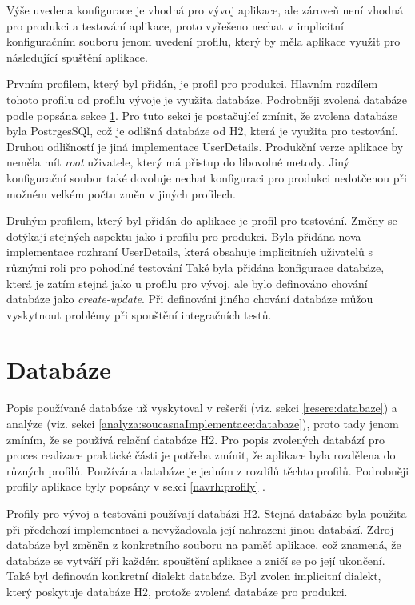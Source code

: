     Výše uvedena konfigurace je vhodná pro vývoj aplikace, ale zároveň není vhodná pro produkci a testování aplikace, proto vyřešeno nechat v implicitní konfiguračním souboru jenom uvedení profilu, který by měla aplikace využit pro následující spuštění aplikace.
    
    Prvním profilem, který byl přidán, je profil pro produkci. Hlavním rozdílem tohoto profilu od profilu vývoje je využita databáze. Podrobněji zvolená databáze podle popsána sekce \ref{navrh:db}. Pro tuto sekci je postačující zmínit, že zvolena databáze byla PostrgesSQl, což je odlišná databáze od H2, která je využita pro testování. Druhou odlišností je jiná implementace UserDetails. Produkční verze aplikace by neměla mít \textit{root} uživatele, který má přistup do libovolné metody. Jiný konfigurační soubor také dovoluje nechat konfiguraci pro produkci nedotčenou při možném velkém počtu změn v jiných profilech.
    
    Druhým profilem, který byl přidán do aplikace je profil pro testování. Změny se dotýkají stejných aspektu jako i profilu pro produkci. Byla přidána nova implementace rozhraní UserDetails, která obsahuje implicitních uživatelů s různými roli pro pohodlné testování  Také byla přidána konfigurace databáze, která je zatím stejná jako u profilu pro vývoj, ale bylo definováno chování databáze jako \textit{create-update}. Při definováni jiného chování databáze můžou vyskytnout problémy při spouštění integračních testů.
    
\section{Databáze} \label{navrh:db}
    Popis používané databáze už vyskytoval v rešerši (viz. sekci \ref{resere:databaze}) a analýze (viz. sekci \ref{analyza:soucasnaImplementace:databaze}), proto tady jenom zmíním, že se používá relační databáze H2. Pro popis zvolených databází pro proces realizace praktické části je potřeba zmínit, že aplikace byla rozdělena do různých profilů. Používána databáze je jedním z rozdílů těchto profilů. Podrobněji profily aplikace byly popsány v sekci \ref{navrh:profily} .
    
    Profily pro vývoj a testováni používají databázi H2. Stejná databáze byla použita při předchozí implementaci a nevyžadovala její nahrazeni jinou databází. Zdroj databáze byl změněn z konkretního souboru na paměť aplikace, což znamená, že databáze se vytváří při každém spouštění aplikace a zničí se po její ukončení. Také byl definován konkretní dialekt databáze. Byl zvolen implicitní dialekt, který poskytuje databáze H2, protože zvolená databáze pro produkci.
    
